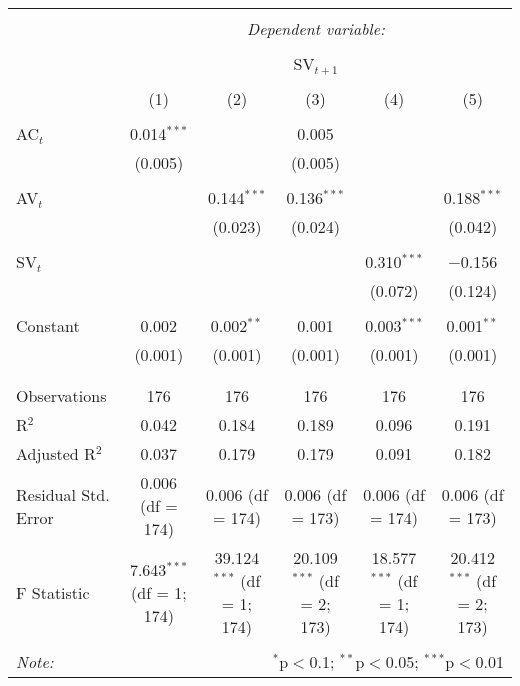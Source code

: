 
\begin{table}[!htbp] \centering 
  \caption{} 
  \label{} 
\begin{tabular}{@{\extracolsep{5pt}}lccccc} 
\\[-1.8ex]\hline 
\hline \\[-1.8ex] 
 & \multicolumn{5}{c}{\textit{Dependent variable:}} \\ 
\cline{2-6} 
\\[-1.8ex] & \multicolumn{5}{c}{SV$_{t+1}$} \\ 
\\[-1.8ex] & (1) & (2) & (3) & (4) & (5)\\ 
\hline \\[-1.8ex] 
 AC$_{t}$ & 0.014$^{***}$ &  & 0.005 &  &  \\ 
  & (0.005) &  & (0.005) &  &  \\ 
  & & & & & \\ 
 AV$_{t}$ &  & 0.144$^{***}$ & 0.136$^{***}$ &  & 0.188$^{***}$ \\ 
  &  & (0.023) & (0.024) &  & (0.042) \\ 
  & & & & & \\ 
 SV$_{t}$ &  &  &  & 0.310$^{***}$ & $-$0.156 \\ 
  &  &  &  & (0.072) & (0.124) \\ 
  & & & & & \\ 
 Constant & 0.002 & 0.002$^{**}$ & 0.001 & 0.003$^{***}$ & 0.001$^{**}$ \\ 
  & (0.001) & (0.001) & (0.001) & (0.001) & (0.001) \\ 
  & & & & & \\ 
\hline \\[-1.8ex] 
Observations & 176 & 176 & 176 & 176 & 176 \\ 
R$^{2}$ & 0.042 & 0.184 & 0.189 & 0.096 & 0.191 \\ 
Adjusted R$^{2}$ & 0.037 & 0.179 & 0.179 & 0.091 & 0.182 \\ 
Residual Std. Error & 0.006 (df = 174) & 0.006 (df = 174) & 0.006 (df = 173) & 0.006 (df = 174) & 0.006 (df = 173) \\ 
F Statistic & 7.643$^{***}$ (df = 1; 174) & 39.124$^{***}$ (df = 1; 174) & 20.109$^{***}$ (df = 2; 173) & 18.577$^{***}$ (df = 1; 174) & 20.412$^{***}$ (df = 2; 173) \\ 
\hline 
\hline \\[-1.8ex] 
\textit{Note:}  & \multicolumn{5}{r}{$^{*}$p$<$0.1; $^{**}$p$<$0.05; $^{***}$p$<$0.01} \\ 
\end{tabular} 
\end{table} 
